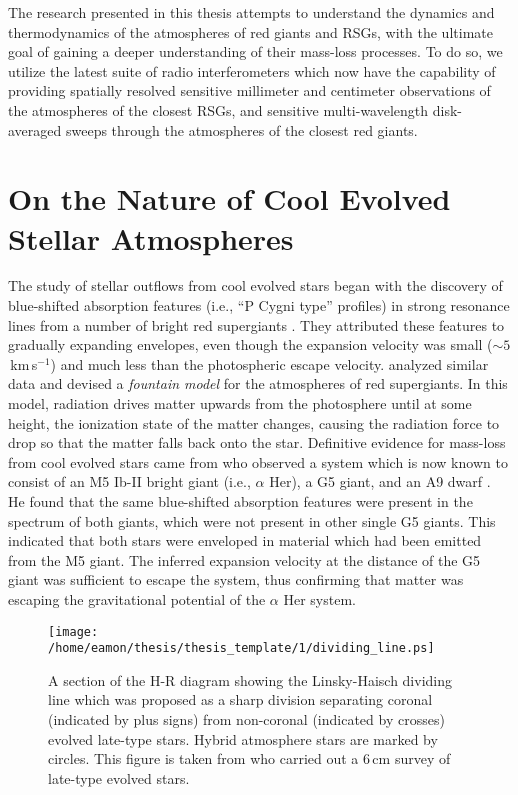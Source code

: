 The research presented in this thesis attempts to understand the dynamics and thermodynamics of the atmospheres of red giants and RSGs, with the ultimate goal of gaining a deeper understanding of their mass-loss processes. To do so, we utilize the latest suite of radio interferometers which now have the capability of providing spatially resolved sensitive millimeter and centimeter observations of the atmospheres of the closest RSGs, and sensitive multi-wavelength disk-averaged sweeps through the atmospheres of the closest red giants.

\section{On the Nature of Cool Evolved Stellar Atmospheres}\label{sec:1.2}
The study of stellar outflows from cool evolved stars began with the discovery of blue-shifted absorption features (i.e., ``P Cygni type'' profiles) in strong resonance lines from a number of bright red supergiants \citep{adams_1935}. They attributed these features to gradually expanding envelopes, even though the expansion velocity was small ($\sim 5$\,km\,s$^{-1}$) and much less than the photospheric escape velocity. \cite{spitzer_1939} analyzed similar data and devised a \textit{fountain model} for the atmospheres of red supergiants. In this model, radiation drives matter upwards from the photosphere until at some height, the ionization state of the matter changes, causing the radiation force to drop so that the matter falls back onto the star. Definitive evidence for mass-loss from cool evolved stars came from \cite{deutsch_1956} who observed a system which is now known to consist of an M5 Ib-II bright giant (i.e., $\alpha$ Her), a G5 giant, and an A9 dwarf \citep{moravveji_2013}. He found that the same blue-shifted absorption features were present in the spectrum of both giants, which were not present in other single G5 giants. This indicated that both stars were enveloped in material which had been emitted from the M5 giant. The inferred expansion velocity at the distance of the G5 giant was sufficient to escape the system, thus confirming that matter was escaping the gravitational potential of the $\alpha$ Her system.

\begin{figure}[hbt!]
\centering 
          \texttt{[image: /home/eamon/thesis/thesis\_template/1/dividing\_line.ps]}
\caption[The Linsky-Haisch dividing line]{A section of the H-R diagram showing the Linsky-Haisch dividing line which was proposed as a sharp division separating coronal (indicated by plus signs) from non-coronal (indicated by crosses) evolved late-type stars. Hybrid atmosphere stars are marked by circles. This figure is taken from \cite{drake_1986} who carried out a 6\,cm survey of late-type evolved stars.}
\label{fig:1.2.1}
\end{figure}

